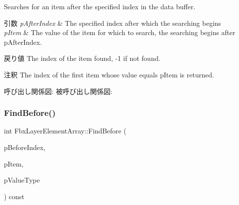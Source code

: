 Searches for an item after the specified index in the data buffer. 
\begin{DoxyParams}{引数}
{\em p\+After\+Index} & The specified index after which the searching begins \\
\hline
{\em p\+Item} & The value of the item for which to search, the searching begins after p\+After\+Index. \\
\hline
\end{DoxyParams}
\begin{DoxyReturn}{戻り値}
The index of the item found, -\/1 if not found. 
\end{DoxyReturn}
\begin{DoxyRemark}{注釈}
The index of the first item whose value equals p\+Item is returned. 
\end{DoxyRemark}
呼び出し関係図\+:
被呼び出し関係図\+:
\mbox{\label{class_fbx_layer_element_array_a98daeb1cd39978cda3a4dd83b32e508d}} 
\subsubsection{\texorpdfstring{Find\+Before()}{FindBefore()}\hspace{0.1cm}{\footnotesize\ttfamily [1/2]}}
{\footnotesize\ttfamily int Fbx\+Layer\+Element\+Array\+::\+Find\+Before (\begin{DoxyParamCaption}\item[{int}]{p\+Before\+Index,  }\item[{const void $\ast$}]{p\+Item,  }\item[{\hyperlink{fbxpropertytypes_8h_a73913a5ddfb20e57c6f25e9e6784bd92}{E\+Fbx\+Type}}]{p\+Value\+Type }\end{DoxyParamCaption}) const}

